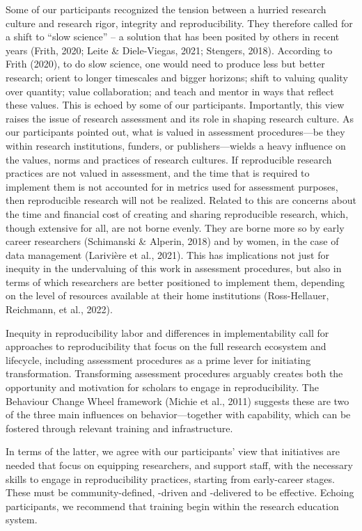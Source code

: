 \documentclass[authordate, meta]{jote-new-article}
\begin{document}
	Some of our participants recognized the tension between a hurried research culture and research rigor, integrity and reproducibility. They therefore called for a shift to “slow science” -- a solution that has been posited by others in recent years (Frith, 2020; Leite \& Diele-Viegas, 2021; Stengers, 2018). According to Frith (2020), to do slow science, one would need to produce less but better research; orient to longer timescales and bigger horizons; shift to valuing quality over quantity; value collaboration; and teach and mentor in ways that reflect these values. This is echoed by some of our participants. Importantly, this view raises the issue of research assessment and its role in shaping research culture. As our participants pointed out, what is valued in assessment procedures—be they within research institutions, funders, or publishers—wields a heavy influence on the values, norms and practices of research cultures. If reproducible research practices are not valued in assessment, and the time that is required to implement them is not accounted for in metrics used for assessment purposes, then reproducible research will not be realized. Related to this are concerns about the time and financial cost of creating and sharing reproducible research, which, though extensive for all, are not borne evenly. They are borne more so by early career researchers (Schimanski \& Alperin, 2018) and by women, in the case of data management (Larivière et al., 2021). This has implications not just for inequity in the undervaluing of this work in assessment procedures, but also in terms of which researchers are better positioned to implement them, depending on the level of resources available at their home institutions (Ross-Hellauer, Reichmann, et al., 2022).



	Inequity in reproducibility labor and differences in implementability call for approaches to reproducibility that focus on the full research ecosystem and lifecycle, including assessment procedures as a prime lever for initiating transformation. Transforming assessment procedures arguably creates both the opportunity and motivation for scholars to engage in reproducibility. The Behaviour Change Wheel framework (Michie et al., 2011) suggests these are two of the three main influences on behavior—together with capability, which can be fostered through relevant training and infrastructure.



	In terms of the latter, we agree with our participants' view that initiatives are needed that focus on equipping researchers, and support staff, with the necessary skills to engage in reproducibility practices, starting from early-career stages. These must be community-defined, -driven and -delivered to be effective. Echoing participants, we recommend that training begin within the research education system.
\end{document}
